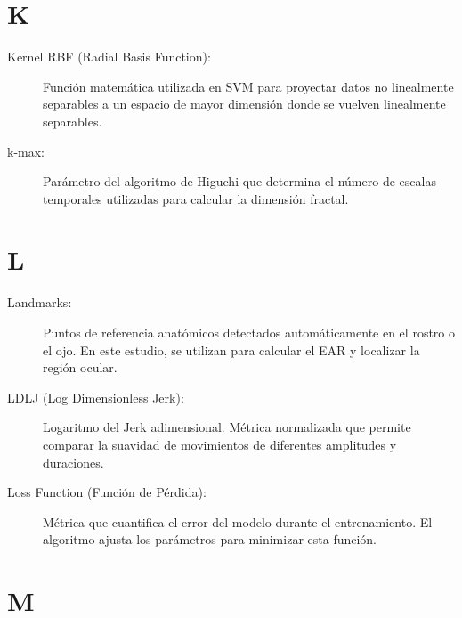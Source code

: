 \section*{K}

\begin{description}
    \item[Kernel RBF (Radial Basis Function):] Función matemática utilizada en SVM para proyectar datos no linealmente separables a un espacio de mayor dimensión donde se vuelven linealmente separables.
    
    \item[k-max:] Parámetro del algoritmo de Higuchi que determina el número de escalas temporales utilizadas para calcular la dimensión fractal.
\end{description}

\section*{L}

\begin{description}
    \item[Landmarks:] Puntos de referencia anatómicos detectados automáticamente en el rostro o el ojo. En este estudio, se utilizan para calcular el EAR y localizar la región ocular.
    
    \item[LDLJ (Log Dimensionless Jerk):] Logaritmo del Jerk adimensional. Métrica normalizada que permite comparar la suavidad de movimientos de diferentes amplitudes y duraciones.
    
    \item[Loss Function (Función de Pérdida):] Métrica que cuantifica el error del modelo durante el entrenamiento. El algoritmo ajusta los parámetros para minimizar esta función.
\end{description}

\section*{M}

